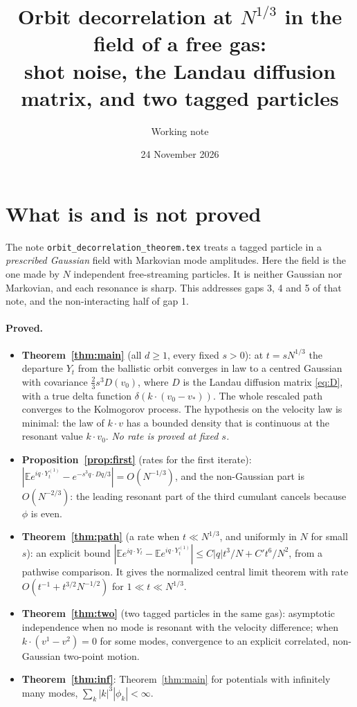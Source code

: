 \documentclass[11pt]{article}
\title{Orbit decorrelation at $N^{1/3}$ in the field of a free gas:\\
shot noise, the Landau diffusion matrix, and two tagged particles}
\author{Working note}
\date{24 November 2026}
\newcommand{\E}{\mathbb{E}}
\theoremstyle{remark}
\begin{document}
\maketitle

\section{What is and is not proved}

The note \texttt{orbit\_decorrelation\_theorem.tex} treats a tagged particle
in a \emph{prescribed Gaussian} field with Markovian mode amplitudes. Here
the field is the one made by $N$ independent free-streaming particles. It is
neither Gaussian nor Markovian, and each resonance is sharp. This addresses
gaps 3, 4 and 5 of that note, and the non-interacting half of gap 1.

\paragraph{Proved.}
\begin{itemize}
  \item \textbf{Theorem~\ref{thm:main}} (all $d\ge1$, every fixed $s>0$): at
    $t=sN^{1/3}$ the departure $Y_t$ from the ballistic orbit converges in law
    to a centred Gaussian with covariance $\tfrac23 s^3D(v_0)$, where $D$ is
    the Landau diffusion matrix \eqref{eq:D}, with a true delta function
    $\delta(k\cdot(v_0-v_*))$. The whole rescaled path converges to the
    Kolmogorov process. The hypothesis on the velocity law is minimal: the
    law of $k\cdot v$ has a bounded density that is continuous at the resonant
    value $k\cdot v_0$. \emph{No rate is proved at fixed $s$.}
  \item \textbf{Proposition~\ref{prop:first}} (rates for the first iterate):
    $|\E e^{iq\cdot Y^{(1)}_t}-e^{-s^3q\cdot Dq/3}|=O(N^{-1/3})$, and the
    non-Gaussian part is $O(N^{-2/3})$: the leading resonant part of the
    third cumulant cancels because $\phi$ is even.
  \item \textbf{Theorem~\ref{thm:path}} (a rate when $t\ll N^{1/3}$, and
    uniformly in $N$ for small $s$): an explicit bound
    $|\E e^{iq\cdot Y_t}-\E e^{iq\cdot Y^{(1)}_t}|\le C|q|t^3/N+C't^6/N^2$,
    from a pathwise comparison. It gives the normalized central limit theorem
    with rate $O(t^{-1}+t^{3/2}N^{-1/2})$ for $1\ll t\ll N^{1/3}$.
  \item \textbf{Theorem~\ref{thm:two}} (two tagged particles in the same
    gas): asymptotic independence when no mode is resonant with the velocity
    difference; when $k\cdot(v^1-v^2)=0$ for some modes, convergence to an
    explicit correlated, non-Gaussian two-point motion.
  \item \textbf{Theorem~\ref{thm:inf}}: Theorem~\ref{thm:main} for potentials
    with infinitely many modes, $\sum_k|k|^3|\phi_k|<\infty$.
\end{itemize}
\end{document}
